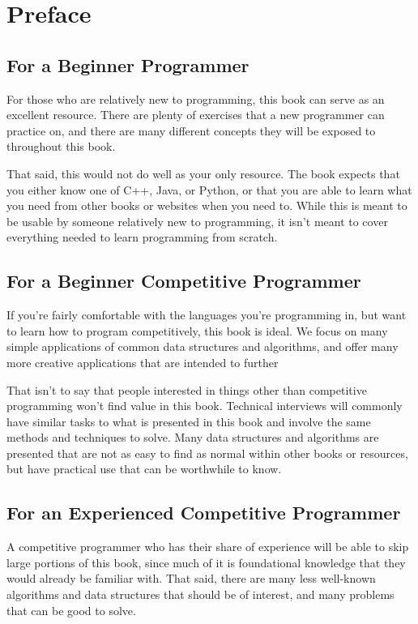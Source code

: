 \section*{Preface}

\subsection*{For a Beginner Programmer}

For those who are relatively new to programming, this book can serve as an excellent resource. There are plenty of exercises that a new programmer can practice on, and there are many different concepts they will be exposed to throughout this book.

That said, this would not do well as your only resource. The book expects that you either know one of C++, Java, or Python, or that you are able to learn what you need from other books or websites when you need to. While this is meant to be usable by someone relatively new to programming, it isn't meant to cover everything needed to learn programming from scratch.

\subsection*{For a Beginner Competitive Programmer}

If you're fairly comfortable with the languages you're programming in, but want to learn how to program competitively, this book is ideal. We focus on many simple applications of common data structures and algorithms, and offer many more creative applications that are intended to further 

That isn't to say that people interested in things other than competitive programming won't find value in this book. Technical interviews will commonly have similar tasks to what is presented in this book and involve the same methods and techniques to solve. Many data structures and algorithms are presented that are not as easy to find as normal within other books or resources, but have practical use that can be worthwhile to know.

\subsection*{For an Experienced Competitive Programmer}

A competitive programmer who has their share of experience will be able to skip large portions of this book, since much of it is foundational knowledge that they would already be familiar with. That said, there are many less well-known algorithms and data structures that should be of interest, and many problems that can be good to solve.

